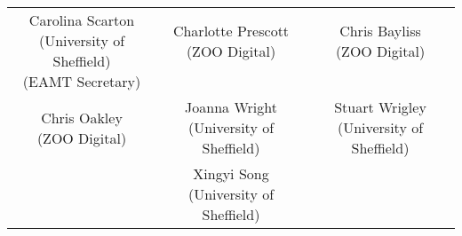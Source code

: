 \begin{center}
\begin{tabular}{ c c c}
	\makecell{Carolina Scarton \\ (University of Sheffield) \\ (EAMT Secretary) \\ \vspace{0.5cm}} & \makecell{Charlotte Prescott \\ (ZOO Digital) \\ \\ \vspace{0.5cm}} & \makecell{Chris Bayliss \\ (ZOO Digital) \\ \\ \vspace{0.5cm}} \\ 
	\makecell{Chris Oakley \\ (ZOO Digital)\\ \vspace{0.5cm}} & \makecell{Joanna Wright \\ (University of Sheffield)\\ \vspace{0.5cm}} & \makecell{Stuart Wrigley \\ (University of Sheffield)\\ \vspace{0.5cm}} \\
	& \makecell{Xingyi Song \\ (University of Sheffield)} &   \\

\end{tabular}
\end{center}



